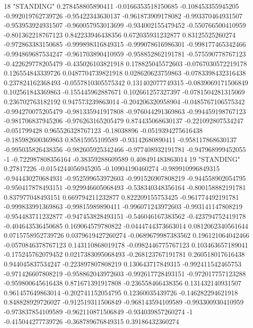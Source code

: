 18 "STANDING" 0.278458805890411 -0.0166353518150685 -0.108453355945205 -0.992019762739726 -0.95422343630137 -0.961873909178082 -0.993370464931507 -0.953953924931507 -0.960057953013699 -0.934002155479452 -0.550766500410959 -0.801362218767123 0.842233946438356 0.672035931232877 0.83125525260274 -0.972863383150685 -0.999898316849315 -0.999078616986301 -0.998177465342466 -0.994869687534247 -0.961703890410959 -0.958852862191781 -0.575590778767123 -0.422629778205479 -0.435026103821918 0.178825045572603 -0.0767030572219178 0.126554843339726 0.0487704739821918 0.028620623759863 -0.0783398432316438 0.237824162368493 -0.0557810305575342 0.131402077749315 -0.0839069171506849 0.102561843369863 -0.155445962887671 0.102661257327397 -0.0781504281315069 0.236702763182192 0.947573239863014 -0.204206320958904 -0.0485767106575342 -0.994270075205479 -0.981335941917808 -0.976044291369863 -0.994459198767123 -0.981706837945206 -0.976263165205479 0.874435068630137 -0.221092807534247 -0.051799428 0.965526328767123 -0.18038896 -0.0519394275616438 -0.185982600369863 0.85815955109589 -0.93142680890411 -0.958117868630137 -0.995035826438356 -0.982605925342466 -0.977408932191781 -0.947968999452055 -1 -0.722987808356164 -0.38359288609589 0.408491483863014
19 "STANDING" 0.27817226 -0.0154244056945205 -0.10904190460274 -0.989910996849315 -0.944430270684931 -0.952599653972603 -0.991526907808219 -0.944558902054795 -0.950417878493151 -0.929946605068493 -0.538340348356164 -0.800158882191781 0.837977048493151 0.669794211232877 0.822209155753425 -0.961774492191781 -0.999833991369863 -0.99815989890411 -0.996071243972603 -0.993141147808219 -0.954483711232877 -0.947453828493151 -0.546046167383562 -0.423794752419178 -0.404643536450685 0.169064579780822 -0.0444744373663014 0.0812062340561644 0.0715758952739726 0.0379619427260274 -0.0689679987383562 0.196121064042466 -0.0570846378767123 0.143110868019178 -0.0982446775767123 0.103463657189041 -0.175245762079452 0.0217383095068493 -0.268123767191781 0.260518017616438 0.944045837534247 -0.223897807808219 0.130643717849315 -0.992411542465753 -0.971426607808219 -0.958862043972603 -0.992617728493151 -0.972017757123288 -0.959800645616438 0.871671391917808 -0.236558466438356 0.131432140931507 0.961457649863014 -0.202741152054795 0.12360035439726 -0.146282294621918 0.848828929726027 -0.912519311506849 -0.968143594109589 -0.993300930410959 -0.973837854109589 -0.962110871506849 -0.934039857260274 -1 -0.415044277739726 -0.368789676849315 0.39186432360274
